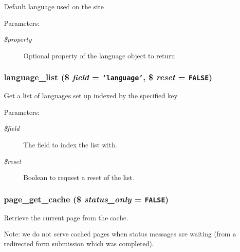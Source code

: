 Default language used on the site

\begin{Desc}
\item[Parameters:]
\begin{description}
\item[{\em \$property}]Optional property of the language object to return \end{description}
\end{Desc}
\hypertarget{bootstrap_8inc_0811ad6f8df4a2f64457914aeafcee3d}{
\subsubsection[{language\_\-list}]{\setlength{\rightskip}{0pt plus 5cm}language\_\-list (\$ {\em field} = {\tt 'language'}, \/  \$ {\em reset} = {\tt FALSE})}}
\label{bootstrap_8inc_0811ad6f8df4a2f64457914aeafcee3d}


Get a list of languages set up indexed by the specified key

\begin{Desc}
\item[Parameters:]
\begin{description}
\item[{\em \$field}]The field to index the list with. \item[{\em \$reset}]Boolean to request a reset of the list. \end{description}
\end{Desc}
\hypertarget{bootstrap_8inc_51e89d55fa18dc4ba2ae09a1f5f936ef}{
\subsubsection[{page\_\-get\_\-cache}]{\setlength{\rightskip}{0pt plus 5cm}page\_\-get\_\-cache (\$ {\em status\_\-only} = {\tt FALSE})}}
\label{bootstrap_8inc_51e89d55fa18dc4ba2ae09a1f5f936ef}


Retrieve the current page from the cache.

Note: we do not serve cached pages when status messages are waiting (from a redirected form submission which was completed).

